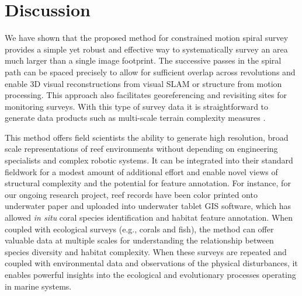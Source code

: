 \section{Discussion}
We have shown that the proposed method for constrained motion spiral survey provides a simple yet robust and effective way to systematically survey an area much larger than a single image footprint. The successive passes in the spiral path can be spaced precisely to allow for sufficient overlap across revolutions and enable 3D visual reconstructions from visual SLAM or structure from motion processing. This approach also facilitates georeferencing and revisiting sites for monitoring surveys. With this type of survey data it is straightforward to generate data products such as multi-scale terrain complexity measures \cite{Friedman_2012}.

This method offers field scientists the ability to generate high resolution, broad scale representations of reef environments without depending on engineering specialists and complex robotic systems. It can be integrated into their standard fieldwork for a modest amount of additional effort and enable novel views of structural complexity and the potential for feature annotation. For instance, for our ongoing research project, reef records have been color printed onto underwater paper and uploaded into underwater tablet GIS software, which has allowed \textit{in situ} coral species identification and habitat feature annotation. When coupled with ecological surveys (e.g., corals and fish), the method can offer valuable data at multiple scales for understanding the relationship between species diversity and habitat complexity. When these surveys are repeated and coupled with environmental data and observations of the physical disturbances, it enables powerful insights into the ecological and evolutionary processes operating in marine systems.

